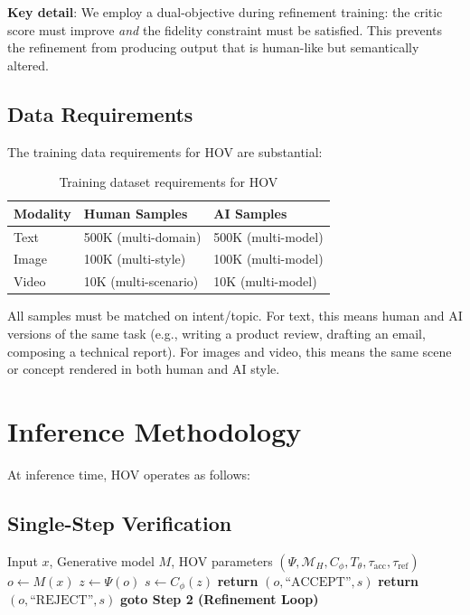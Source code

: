 \documentclass[12pt,oneside]{article}
\begin{document}
\textbf{Key detail}: We employ a dual-objective during refinement training: the critic score must improve \textit{and} the fidelity constraint must be satisfied. This prevents the refinement from producing output that is human-like but semantically altered.

\subsection{Data Requirements}

The training data requirements for HOV are substantial:

\begin{table}[H]
\centering
\caption{Training dataset requirements for HOV}
\begin{tabular}{@{}lll@{}}
\toprule
\textbf{Modality} & \textbf{Human Samples} & \textbf{AI Samples} \\
\midrule
Text & 500K (multi-domain) & 500K (multi-model) \\
Image & 100K (multi-style) & 100K (multi-model) \\
Video & 10K (multi-scenario) & 10K (multi-model) \\
\bottomrule
\end{tabular}
\end{table}

All samples must be matched on intent/topic. For text, this means human and AI versions of the same task (e.g., writing a product review, drafting an email, composing a technical report). For images and video, this means the same scene or concept rendered in both human and AI style.

\section{Inference Methodology}

At inference time, HOV operates as follows:

\subsection{Single-Step Verification}

\begin{algorithm}[H]
\caption{HOV Verification Gate (Single-Step)}
\begin{algorithmic}[1]
\Require Input $x$, Generative model $M$, HOV parameters $(\Psi, \mathcal{M}_H, C_\phi, T_\theta, \tau_\text{acc}, \tau_\text{ref})$
\State $o \leftarrow M(x)$
\State $z \leftarrow \Psi(o)$
\State $s \leftarrow C_\phi(z)$
    \State \textbf{return} $(o, \text{``ACCEPT''}, s)$
    \State \textbf{return} $(o, \text{``REJECT''}, s)$
\Else
    \State \textbf{goto Step 2 (Refinement Loop)}
\EndIf
\end{algorithmic}
\end{algorithm}
\end{document}
